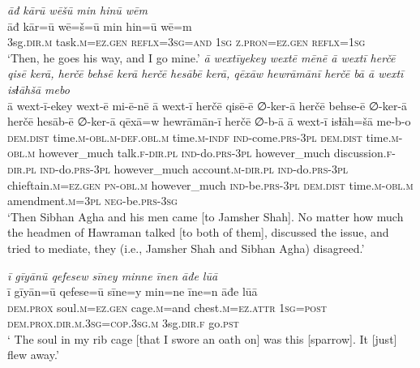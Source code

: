 \ea \label{DP.45}
\textit{āđ kārū wēšū min hinū wēm} \\ 
\gll āđ kār=ū wē=š=ū min hin=ū wē=m \\ 
 3sg\textsc{.dir}\textsc{.m} task\textsc{.m}\textsc{=ez}\textsc{.gen} \textsc{reflx}\textsc{=3sg}\textsc{=and} \textsc{1sg} \textsc{z.pron}\textsc{=ez}\textsc{.gen} \textsc{reflx}\textsc{=1sg} \\ 
\glt `Then, he goes his way, and I go mine.'
\z 
\ea \label{DP.46}
\textit{ā wextīyekey wextē mēnē ā wextī herčē qisē kerā, herčē behsē kerā herčē hesābē kerā, qēxāw hewrāmānī herčē bā ā wextī isɫāhšā mebo} \\ 
\gll ā wext-ī-ekey wext-ē mi-ē-nē ā wext-ī herčē qisē-ē ∅-ker-ā herčē behse-ē ∅-ker-ā herčē hesāb-ē ∅-ker-ā qēxā=w hewrāmān-ī herčē ∅-b-ā ā wext-ī isɫāh=šā me-b-o \\ 
 \textsc{dem.dist} time\textsc{.m}\textsc{-obl}\textsc{.m}\textsc{-def}\textsc{.obl}\textsc{.m} time\textsc{.m}\textsc{-indf} \textsc{ind-}come\textsc{.prs}\textsc{-3pl} \textsc{dem.dist} time\textsc{.m}\textsc{-obl}\textsc{.m} however\_much talk\textsc{\textsc{.f}}\textsc{-dir}\textsc{.pl} \textsc{ind-}do\textsc{.prs}\textsc{-3pl} however\_much discussion\textsc{\textsc{.f}}\textsc{-dir}\textsc{.pl} \textsc{ind-}do\textsc{.prs}\textsc{-3pl} however\_much account\textsc{.m}\textsc{-dir}\textsc{.pl} \textsc{ind-}do\textsc{.prs}\textsc{-3pl} chieftain\textsc{.m}\textsc{=ez}\textsc{.gen} \textsc{pn}\textsc{-obl}\textsc{.m} however\_much \textsc{ind-}be\textsc{.prs}\textsc{-3pl} \textsc{dem.dist} time\textsc{.m}\textsc{-obl}\textsc{.m} amendment\textsc{.m}\textsc{=3pl} \textsc{neg-}be\textsc{.prs}\textsc{-3sg} \\ 
\glt `Then Sibhan Agha and his men came [to Jamsher Shah]. No matter how much the headmen of Hawraman talked [to both of them], discussed the issue, and tried to mediate, they (i.e., Jamsher Shah and Sibhan Agha) disagreed.'
\z 
 
\ea \label{DP.49}
\textit{ī gīyānū qefesew sīney minne īnen āđe lūā} \\ 
\gll ī gīyān=ū qefese=ū sīne=y min=ne īne=n āđe lūā \\ 
 \textsc{dem.prox} soul\textsc{.m}\textsc{=ez}\textsc{.gen} cage\textsc{.m}=and chest\textsc{.m}\textsc{=ez}.\textsc{attr} \textsc{1sg}\textsc{=\textsc{post}} \textsc{dem.prox}\textsc{.dir}\textsc{.m}\textsc{.3sg}\textsc{=cop}\textsc{.3sg}\textsc{.m} 3sg\textsc{.dir}\textsc{\textsc{.f}} go\textsc{.pst} \\ 
\glt ` The soul in my rib cage [that I swore an oath on] was this [sparrow]. It [just] flew away.'
\z 
 
